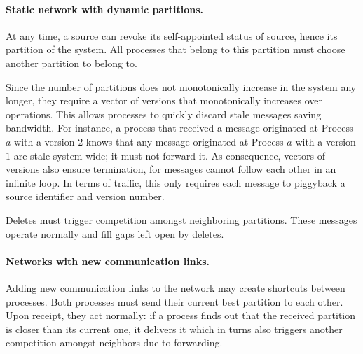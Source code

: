 \paragraph{Static network with dynamic partitions.}
At any time, a source can revoke its self-appointed status of source,
hence  its partition of the system. All processes that
belong to this partition must choose another partition to belong to.

\noindent Since the number of partitions does not monotonically
increase in the system any longer, they require a vector of versions
that monotonically increases over  operations. This
allows processes to quickly discard stale messages saving
bandwidth. For instance, a process that received a message originated
at Process $a$ with a version $2$ knows that any message originated at
Process $a$ with a version $1$ are stale system-wide; it must not
forward it. As consequence, vectors of versions also ensure
termination, for messages  cannot follow each other
in an infinite loop. In terms of traffic, this only requires each
 message to piggyback a source identifier and version
number.


\noindent Deletes must trigger competition amongst neighboring
partitions. These  messages operate normally and fill gaps
left open by deletes.

\paragraph{Networks with new communication links.}
Adding new communication links to the network may create shortcuts
between processes. Both processes must send their current best
partition to each other. Upon receipt, they act normally: if a process
finds out that the received partition is closer than its current one,
it delivers it which in turns also triggers another competition
amongst neighbors due to forwarding.

